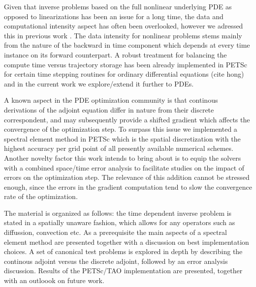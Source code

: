 \documentclass[10pt]{article}
\begin{document}
Given that inverse problems based on the full nonlinear underlying PDE as opposed to linearizations has been an issue for a long time, the data and computational intensity aspect has often been overlooked, however we adressed this in previous work \cite{schanen_2016}. The data intensity for nonlinear problems stems mainly from the nature of the backward in time component which depends at every time instance on its forward counterpart. A robust treatment for balancing the compute time versus trajectory storage has been already implemented in PETSc for certain time stepping routines for ordinary differential equations (cite hong) and in the current work we explore/extend it further to PDEs. 

A known aspect in the PDE optimization community is that continous derivations of the adjoint equation differ in nature from their discrete correspondent, and may subsequently provide a shifted gradient which affects the convergence of the optimization step. To surpass this issue we implemented a spectral element method in PETSc which is the spatial discretization with the highest accuracy per grid point of all presently available numerical schemes. Another novelty factor this work intends to bring about is to equip the solvers with a combined space/time error analysis to facilitate studies on the impact of errors on the optimization step. The relevance of this addition cannot be stressed enough, since the errors in the gradient computation tend to slow the convergence rate of the optimization.

The material is organized as follows: the time dependent inverse problem is stated in a spatially unaware fashion, which allows for any operators such as diffussion, convection etc. As a prerequisite the main aspects of a spectral element method are presented together with a discussion on best implementation choices. A set of canonical test problems is explored in depth by describing the continous adjoint versus the discrete adjoint, followed by an error analysis discussion. Results of the PETSc/TAO implementation are presented, together with an outloook on future work.


  
\end{document}
